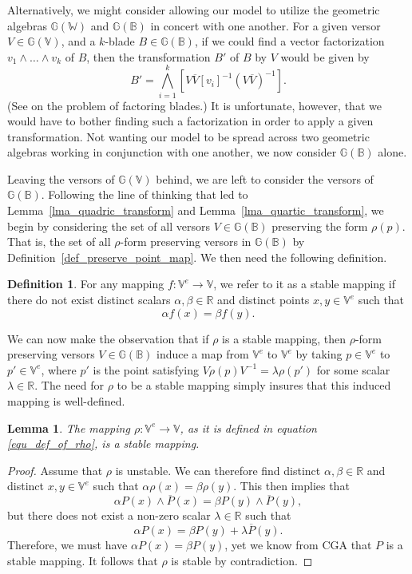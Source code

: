 \documentclass{birkjour}
\newtheorem{lem}[thm]{Lemma}
\theoremstyle{definition}
\newtheorem{defn}[thm]{Definition}
\theoremstyle{remark}
\numberwithin{equation}{section}
\newcommand{\G}{\mathbb{G}}
\newcommand{\V}{\mathbb{V}}
\newcommand{\W}{\mathbb{W}}
\newcommand{\R}{\mathbb{R}}
\newcommand{\B}{\mathbb{B}}
\begin{document}
Alternatively, we might consider allowing our model to utilize the geometric
algebras $\G(\W)$ and $\G(\B)$ in concert with one another.
For a given versor $V\in\G(\V)$,
and a $k$-blade $B\in\G(\B)$, if we could find a vector factorization $v_1\wedge\dots\wedge v_k$
of $B$, then the transformation $B'$ of $B$ by $V$ would be given by
\begin{equation}
B' = \bigwedge_{i=1}^k [V\overline{V}[v_i]^{-1}(V\overline{V})^{-1}].
\end{equation}
(See \cite{Fontijne10} on the problem of factoring blades.)  It is unfortunate, however,
that we would have to bother finding such a factorization in order to apply a given
transformation.  Not wanting our model to be spread across two geometric algebras
working in conjunction with one another, we now consider $\G(\B)$ alone.

Leaving the versors of $\G(\V)$ behind, we are left to consider the versors of $\G(\B)$.
Following the line of thinking that led to Lemma~\ref{lma_quadric_transform} and 
Lemma~\ref{lma_quartic_transform}, we begin by
considering the set of all versors $V\in\G(\B)$ preserving the form $\rho(p)$.
That is, the set of all $\rho$-form preserving versors in $\G(\B)$ by
Definition~\ref{def_preserve_point_map}.
We then need the following definition.

\begin{defn}\label{def_stable_mapping}
For any mapping $f:\V^e\to\V$, we refer to it as a stable mapping
if there do not exist distinct scalars $\alpha,\beta\in\R$ and
distinct points $x,y\in\V^e$ such that
\begin{equation}
\alpha f(x)=\beta f(y).
\end{equation}
\end{defn}

We can now make the observation that if $\rho$ is a stable mapping,
then $\rho$-form preserving versors $V\in\G(\B)$ induce a map from $\V^e$ to $\V^e$ by
taking $p\in\V^e$ to $p'\in\V^e$, where $p'$ is the point satisfying
$V\rho(p)V^{-1}=\lambda\rho(p')$ for some scalar $\lambda\in\R$.
The need for $\rho$ to be a stable mapping simply insures that this
induced mapping is well-defined.

\begin{lem}
The mapping $\rho:\V^e\to\V$, as it is defined in equation \eqref{equ_def_of_rho},
is a stable mapping.
\end{lem}
\begin{proof}
Assume that $\rho$ is unstable.  We can therefore find distinct $\alpha,\beta\in\R$ and distinct $x,y\in\V^e$
such that $\alpha\rho(x)=\beta\rho(y)$.  This then implies that
\begin{equation}
\alpha P(x)\wedge\overline{P}(x) = \beta P(y)\wedge\overline{P}(y),
\end{equation}
but there does not exist a non-zero scalar $\lambda\in\R$ such that
\begin{equation}
\alpha P(x) = \beta P(y) + \lambda\overline{P}(y).
\end{equation}
Therefore, we must have $\alpha P(x)=\beta P(y)$, yet we know
from CGA that $P$ is a stable mapping.  It follows that $\rho$ is stable by contradiction.
\end{proof}
\end{document}
